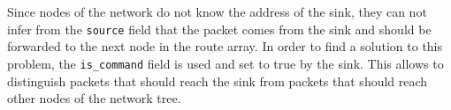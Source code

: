 Since nodes of the network do not know the address of the sink, they can not infer from the \texttt{source} field that the packet comes from the sink and should be forwarded to the next node in the route array. In order to find a solution to this problem, the \texttt{is\_command} field is used and set to true by the sink. This allows to distinguish packets that should reach the sink from packets that should reach other nodes of the network tree.




